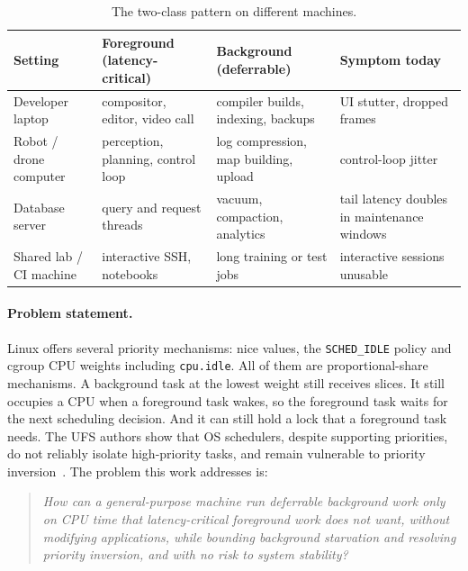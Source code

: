 \documentclass[11pt,a4paper]{article}
\newcommand{\code}[1]{\texttt{#1}}
\begin{document}
\begin{table}[h]
\centering\small
\caption{The two-class pattern on different machines.}
\label{tab:usecases}
\begin{tabularx}{\linewidth}{@{}lXXX@{}}
\toprule
Setting & Foreground (latency-critical) & Background (deferrable) & Symptom today \\
\midrule
Developer laptop & compositor, editor, video call & compiler builds, indexing, backups & UI stutter, dropped frames \\
Robot / drone computer & perception, planning, control loop & log compression, map building, upload & control-loop jitter \\
Database server & query and request threads & vacuum, compaction, analytics & tail latency doubles in maintenance windows \\
Shared lab / CI machine & interactive SSH, notebooks & long training or test jobs & interactive sessions unusable \\
\bottomrule
\end{tabularx}
\end{table}

\paragraph{Problem statement.}
Linux offers several priority mechanisms: nice values, the \code{SCHED\_IDLE}
policy and cgroup CPU weights including \code{cpu.idle}. All of them are
proportional-share mechanisms. A background task at the lowest weight still
receives slices. It still occupies a CPU when a foreground task wakes, so the
foreground task waits for the next scheduling decision. And it can still hold
a lock that a foreground task needs. The UFS authors show that OS schedulers,
despite supporting priorities, do not reliably isolate high-priority tasks,
and remain vulnerable to priority inversion~\cite{ufs2026}.
The problem this work addresses is:

\begin{quote}
\emph{How can a general-purpose machine run deferrable background work only
on CPU time that latency-critical foreground work does not want, without
modifying applications, while bounding background starvation and resolving
priority inversion, and with no risk to system stability?}
\end{quote}
\end{document}

